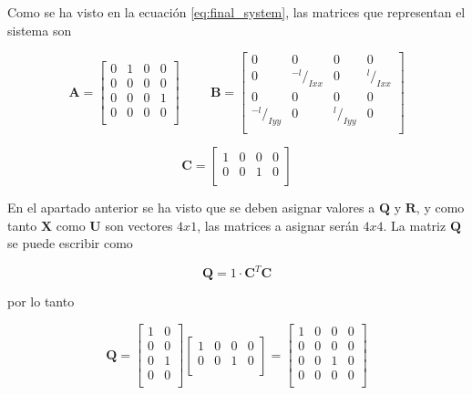 \documentclass[twoside,11pt]{book}
\begin{document}
Como se ha visto en la ecuación \ref{eq:final_system}, las matrices que representan el sistema son

\begin{equation}
\pmb{A}= \left[ \begin{array}{cccc}
0 & 1 & 0 & 0 \\
0 & 0 & 0 & 0 \\
0 & 0 & 0 & 1 \\
0 & 0 & 0 & 0 \\ \end{array} \right] \hspace{1cm} \pmb{B}=\left[ \begin{array}{cccc}
0 & 0 & 0 & 0 \\
0 & {}^{-l}/_{Ixx} & 0 & {}^{l}/_{Ixx} \\ 
0 & 0 & 0 & 0 \\
{}^{-l}/_{Iyy} & 0 & {}^{l}/_{Iyy} & 0 \\ \end{array} \right] 
\end{equation} 

\begin{equation}
\nonumber
\pmb{C}=\left[ \begin{array}{cccc}
1 & 0 & 0 & 0 \\
0 & 0 & 1 & 0 \\ \end{array} \right] 
\end{equation} 

En el apartado anterior se ha visto que se deben asignar valores a $\mathbf{Q}$ y $\mathbf{R}$, y como tanto $\mathbf{X}$ como $\mathbf{U}$ son vectores $4x1$, las matrices a asignar serán $4x4$. La matriz $\mathbf{Q}$ se puede escribir como 

\begin{equation}
\mathbf{Q}=1 \cdot \pmb{C}^{T}\pmb{C}
\end{equation}

por lo tanto 

\begin{equation}
\mathbf{Q}= \left[ \begin{array}{cc}
1 & 0 \\
0 & 0 \\
0 & 1 \\
0 & 0 \\ \end{array} \right] \left[ \begin{array}{cccc}
1 & 0 & 0 & 0 \\
0 & 0 & 1 & 0 \\ \end{array} \right] = \left[ \begin{array}{cccc}
1 & 0 & 0 & 0 \\
0 & 0 & 0 & 0 \\
0 & 0 & 1 & 0 \\
0 & 0 & 0 & 0 \\ \end{array} \right]
\end{equation}
\end{document}
